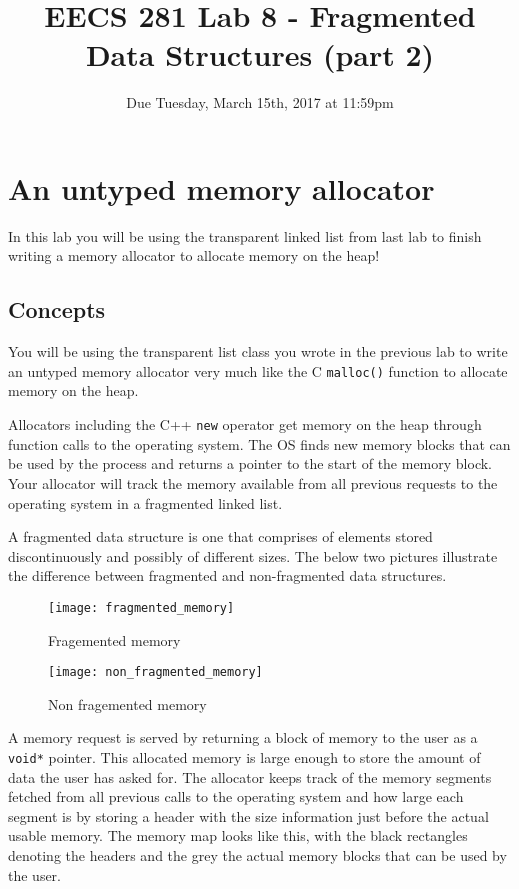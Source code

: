 \documentclass{article}
\begin{document}
\title{\textbf{EECS 281 Lab 8 - Fragmented Data Structures (part 2)}}
\author{Due Tuesday, March 15th, 2017 at 11:59pm}
\date{}
\maketitle
{}
{
   \pagestyle{empty}
}
\thispagestyle{firststyle}

\section{An untyped memory allocator}

In this lab you will be using the transparent linked list from last lab to
finish writing a memory allocator to allocate memory on the heap!

\subsection{Concepts}
You will be using the transparent list class you wrote in the previous lab to
write an untyped memory allocator very much like the C \texttt{malloc()}
function to allocate memory on the heap.

Allocators including the C++ \texttt{new} operator get memory on the heap
through function calls to the operating system.  The OS finds new memory
blocks that can be used by the process and returns a pointer to the start of
the memory block.  Your allocator will track the memory available from all
previous requests to the operating system in a fragmented linked list.

A fragmented data structure is one that comprises of elements stored
discontinuously and possibly of different sizes.  The below two pictures
illustrate the difference between fragmented and non-fragmented data
structures.

\begin{figure}[!htb]
\centering
\texttt{[image: fragmented\_memory]}
\caption{Fragemented memory}
\end{figure}

\begin{figure}[!htb]
\centering
\texttt{[image: non\_fragmented\_memory]}
\caption{Non fragemented memory}
\end{figure}

A memory request is served by returning a block of memory to the user as a
\texttt{void*} pointer.  This allocated memory is large enough to store the
amount of data the user has asked for.  The allocator keeps track of the
memory segments fetched from all previous calls to the operating system and
how large each segment is by storing a header with the size information just
before the actual usable memory.  The memory map looks like this, with the
black rectangles denoting the headers and the grey the actual memory blocks
that can be used by the user.
\end{document}
